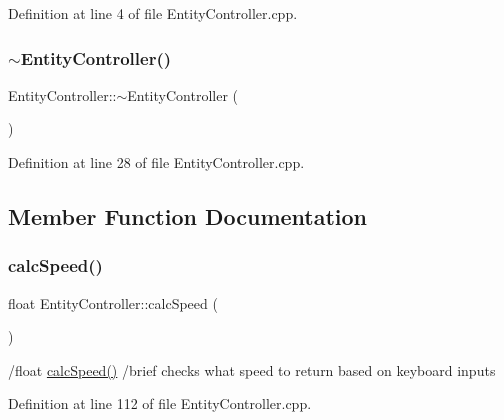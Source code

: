 Definition at line 4 of file Entity\+Controller.\+cpp.

\mbox{\label{class_entity_controller_ad55bccfe26fd9a5486a749b2b49a0478}} 
\subsubsection{\texorpdfstring{$\sim$\+Entity\+Controller()}{~EntityController()}}
{\footnotesize\ttfamily Entity\+Controller\+::$\sim$\+Entity\+Controller (\begin{DoxyParamCaption}{ }\end{DoxyParamCaption})}



Definition at line 28 of file Entity\+Controller.\+cpp.



\subsection{Member Function Documentation}
\mbox{\label{class_entity_controller_ab847c4e0ddefc7f23b2993c4cdc825a4}} 
\subsubsection{\texorpdfstring{calc\+Speed()}{calcSpeed()}}
{\footnotesize\ttfamily float Entity\+Controller\+::calc\+Speed (\begin{DoxyParamCaption}{ }\end{DoxyParamCaption})}

/float \hyperlink{class_entity_controller_ab847c4e0ddefc7f23b2993c4cdc825a4}{calc\+Speed()} /brief checks what speed to return based on keyboard inputs 

Definition at line 112 of file Entity\+Controller.\+cpp.

\mbox{\label{class_entity_controller_a82e17378b1553449be6f93a8c18eefee}} 
